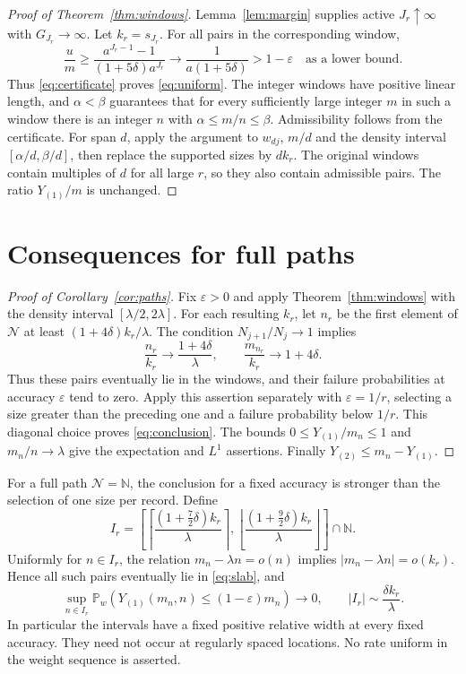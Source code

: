 \documentclass[11pt]{article}
\theoremstyle{remark}\newtheorem{remark}[theorem]{Remark}
\newcommand{\Pp}{\mathbb P}
\newcommand{\N}{\mathbb N}
\begin{document}
\begin{proof}[Proof of Theorem~\ref{thm:windows}]
Lemma~\ref{lem:margin} supplies active $J_r\uparrow\infty$ with
$G_{J_r}\to\infty$. Let $k_r=s_{J_r}$. For all pairs in the corresponding
window,
\[
 \frac{u}{m}\ge\frac{a^{J_r-1}-1}{(1+5\delta)a^{J_r}}
 \longrightarrow\frac1{a(1+5\delta)}>1-\varepsilon
 \quad\text{as a lower bound}.
\]
Thus \eqref{eq:certificate} proves \eqref{eq:uniform}. The integer windows
have positive linear length, and $\alpha<\beta$ guarantees that for every
sufficiently large integer $m$ in such a window there is an integer $n$
with $\alpha\le m/n\le\beta$. Admissibility follows from the certificate.
For span $d$, apply the argument to $w_{dj}$, $m/d$ and the density interval
$[\alpha/d,\beta/d]$, then replace the supported sizes by $d k_r$.
The original windows contain multiples of $d$ for all large $r$, so they
also contain admissible pairs. The ratio $Y_{(1)}/m$ is unchanged.
\end{proof}

\section{Consequences for full paths}\label{sec:paths}
\begin{proof}[Proof of Corollary~\ref{cor:paths}]
Fix $\varepsilon>0$ and apply Theorem~\ref{thm:windows} with the density
interval $[\lambda/2,2\lambda]$. For each resulting $k_r$, let $n_r$ be the
first element of $\mathcal N$ at least $(1+4\delta)k_r/\lambda$.
The condition $N_{j+1}/N_j\to1$ implies
\[
 \frac{n_r}{k_r}\to\frac{1+4\delta}{\lambda},\qquad
 \frac{m_{n_r}}{k_r}\to1+4\delta.
\]
Thus these pairs eventually lie in the windows, and their failure
probabilities at accuracy $\varepsilon$ tend to zero. Apply this assertion
separately with $\varepsilon=1/r$, selecting a size greater than the preceding
one and a failure probability below $1/r$. This diagonal choice proves
\eqref{eq:conclusion}. The bounds $0\le Y_{(1)}/m_n\le1$ and
$m_n/n\to\lambda$ give the expectation and $L^1$ assertions. Finally
$Y_{(2)}\le m_n-Y_{(1)}$.
\end{proof}

For a full path $\mathcal N=\N$, the conclusion for a fixed accuracy is
stronger than the selection of one size per record. Define
\begin{equation}\label{eq:sizeintervals}
 I_r=\left[
 \left\lceil\frac{(1+\tfrac72\delta)k_r}{\lambda}\right\rceil,
 \left\lfloor\frac{(1+\tfrac92\delta)k_r}{\lambda}\right\rfloor
 \right]\cap\N.
\end{equation}
Uniformly for $n\in I_r$, the relation $m_n-\lambda n=o(n)$ implies
$|m_n-\lambda n|=o(k_r)$. Hence all such pairs eventually lie in
\eqref{eq:slab}, and
\begin{equation}\label{eq:blocks}
 \sup_{n\in I_r}\Pp_w(Y_{(1)}(m_n,n)\le(1-\varepsilon)m_n)\to0,
 \qquad |I_r|\sim\frac{\delta k_r}{\lambda}.
\end{equation}
In particular the intervals have a fixed positive relative width at every
fixed accuracy. They need not occur at regularly spaced locations.
No rate uniform in the weight sequence is asserted.
\end{document}

